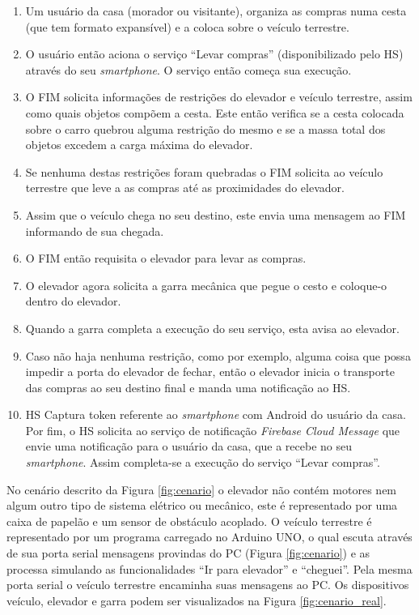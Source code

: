 \begin{enumerate}
\item Um usuário da casa (morador ou visitante), organiza as compras numa cesta (que tem formato expansível) e a coloca sobre o veículo terrestre.
\item O usuário então aciona o serviço ``Levar compras'' (disponibilizado pelo HS) através do seu \textit{smartphone}. O serviço então começa sua execução.
\item O FIM solicita informações de restrições do elevador e veículo terrestre, assim como quais objetos compõem a cesta. Este então verifica se a cesta colocada sobre o carro quebrou alguma restrição do mesmo e se a massa total dos objetos excedem a carga máxima do elevador.
\item Se nenhuma destas restrições foram quebradas o FIM solicita ao veículo terrestre que leve a as compras até as proximidades do elevador.
\item Assim que o veículo chega no seu destino, este envia uma mensagem ao FIM informando de sua chegada.
\item O FIM então requisita o elevador para levar as compras.
\item O elevador agora solicita a garra mecânica que pegue o cesto e coloque-o dentro do elevador.
\item Quando a garra completa a execução do seu serviço, esta avisa ao elevador.
\item Caso não haja nenhuma restrição, como por exemplo, alguma coisa que possa impedir a porta do elevador de fechar, então o elevador inicia o transporte das compras ao seu destino final e manda uma notificação ao HS.
\item HS Captura token referente ao \textit{smartphone} com Android\footnotemark {} do usuário da casa. Por fim, o HS solicita ao serviço de notificação \textit{Firebase Cloud Message}\footnotemark {} que envie uma notificação para o usuário da casa, que a recebe no seu \textit{smartphone}. Assim completa-se a execução do serviço ``Levar compras''.
\end{enumerate}

No cenário descrito da Figura \ref{fig:cenario} o elevador não contém motores nem algum outro tipo de sistema elétrico ou mecânico, este é representado por uma caixa de papelão e um sensor de obstáculo acoplado. O veículo terrestre é representado por um programa carregado no Arduino UNO\footnotemark {}, o qual escuta através de sua porta serial mensagens provindas do PC (Figura \ref{fig:cenario}) e as processa simulando as funcionalidades ``Ir para elevador'' e ``cheguei''. Pela mesma porta serial o veículo terrestre encaminha suas mensagens ao PC. Os dispositivos veículo, elevador e garra podem ser visualizados na Figura \ref{fig:cenario_real}.

